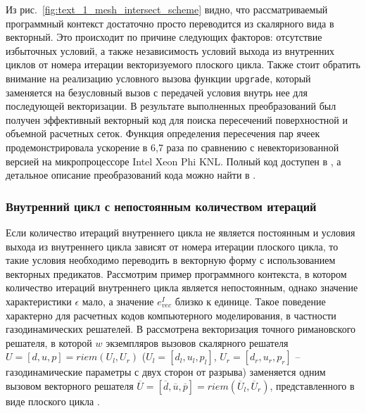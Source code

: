 Из рис.~\ref{fig:text_1_mesh_intersect_scheme} видно, что рассматриваемый программный контекст достаточно просто переводится из скалярного вида в векторный.
Это происходит по причине следующих факторов: отсутствие избыточных условий, а также независимость условий выхода из внутренних циклов от номера итерации векторизуемого плоского цикла.
Также стоит обратить внимание на реализацию условного вызова функции \texttt{upgrade}, который заменяется на безусловный вызов с передачей условия внутрь нее для последующей векторизации.
В результате выполненных преобразований был получен эффективный векторный код для поиска пересечений поверхностной и объемной расчетных сеток.
Функция определения пересечения пар ячеек продемонстрировала ускорение в 6,7 раза по сравнению с невекторизованной версией на микропроцессоре Intel Xeon Phi KNL\label{abbr:knl-10}.
Полный код доступен в \cite{iparGithub}, а детальное описание преобразований кода можно найти в \cite{Rybakov2019VecInt}.

\subsubsection{Внутренний цикл с непостоянным количеством итераций}\label{sec:text_4_vec_riemann}

Если количество итераций внутреннего цикла не является постоянным и условия выхода из внутреннего цикла зависят от номера итерации плоского цикла, то такие условия необходимо переводить в векторную форму с использованием векторных предикатов.
Рассмотрим пример программного контекста, в котором количество итераций внутреннего цикла является непостоянным, однако значение характеристики $\epsilon$ мало, а значение $e_{vec}^I$ близко к единице.
Такое поведение характерно для расчетных кодов компьютерного моделирования, в частности газодинамических решателей.
В \cite{Rybakov2019VecRiem1,Rybakov2019VecRiem2} рассмотрена векторизация точного римановского решателя, в которой $w$ экземпляров вызовов скалярного решателя $U = [d, u, p] = riem(U_l, U_r)$ ($U_l = [d_l, u_l, p_l]$, $U_r = [d_r, u_r, p_r]$ -- газодинамические параметры с двух сторон от разрыва) заменяется одним вызовом векторного решателя $\overline{U} = [\overline{d}, \overline{u}, \overline{p}] = riem(\overline{U}_l, \overline{U}_r)$, представленного в виде плоского цикла \cite{riemannvecGithub}.

